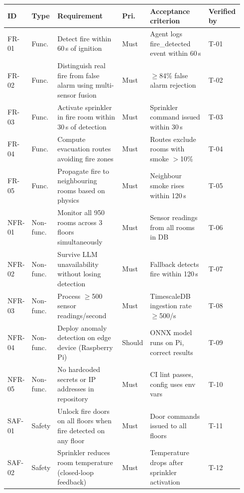 \documentclass[11pt]{article}
\begin{document}
\begin{longtable}[]{@{}
  >{\raggedright\arraybackslash}p{0.07\linewidth}
  >{\raggedright\arraybackslash}p{0.08\linewidth}
  >{\raggedright\arraybackslash}p{0.30\linewidth}
  >{\raggedright\arraybackslash}p{0.06\linewidth}
  >{\raggedright\arraybackslash}p{0.28\linewidth}
  >{\raggedright\arraybackslash}p{0.15\linewidth}@{}}
\toprule
\textbf{ID} & \textbf{Type} & \textbf{Requirement} & \textbf{Pri.} & \textbf{Acceptance criterion} & \textbf{Verified by} \\
\midrule
\endhead
FR-01 & Func. & Detect fire within 60\,s of ignition & Must & Agent logs fire\_detected event within 60\,s & T-01 \\
FR-02 & Func. & Distinguish real fire from false alarm using multi-sensor fusion & Must & $\geq$84\% false alarm rejection & T-02 \\
FR-03 & Func. & Activate sprinkler in fire room within 30\,s of detection & Must & Sprinkler command issued within 30\,s & T-03 \\
FR-04 & Func. & Compute evacuation routes avoiding fire zones & Must & Routes exclude rooms with smoke $>$10\% & T-04 \\
FR-05 & Func. & Propagate fire to neighbouring rooms based on physics & Must & Neighbour smoke rises within 120\,s & T-05 \\
NFR-01 & Non-func. & Monitor all 950 rooms across 3 floors simultaneously & Must & Sensor readings from all rooms in DB & T-06 \\
NFR-02 & Non-func. & Survive LLM unavailability without losing detection & Must & Fallback detects fire within 120\,s & T-07 \\
NFR-03 & Non-func. & Process $\geq$500 sensor readings/second & Must & TimescaleDB ingestion rate $\geq$500/s & T-08 \\
NFR-04 & Non-func. & Deploy anomaly detection on edge device (Raspberry Pi) & Should & ONNX model runs on Pi, correct results & T-09 \\
NFR-05 & Non-func. & No hardcoded secrets or IP addresses in repository & Must & CI lint passes, config uses env vars & T-10 \\
SAF-01 & Safety & Unlock fire doors on all floors when fire detected on any floor & Must & Door commands issued to all floors & T-11 \\
SAF-02 & Safety & Sprinkler reduces room temperature (closed-loop feedback) & Must & Temperature drops after sprinkler activation & T-12 \\
\bottomrule
\end{longtable}
\end{document}
